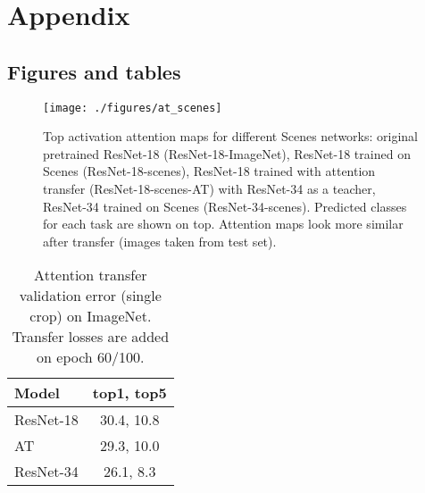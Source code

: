 \documentclass{article} \usepackage{iclr2017_conference}
\begin{document}



\newpage
\appendix
\section{Appendix}
\subsection{Figures and tables}

\begin{figure}[ht]
  \centering
  \texttt{[image: ./figures/at\_scenes]}
  \caption{Top activation attention maps for different Scenes networks: original pretrained ResNet-18 (ResNet-18-ImageNet), ResNet-18 trained on Scenes (ResNet-18-scenes), ResNet-18 trained with attention transfer (ResNet-18-scenes-AT) with ResNet-34 as a teacher, ResNet-34 trained on Scenes (ResNet-34-scenes). Predicted classes for each task are shown on top. Attention maps look more similar after transfer (images taken from test set).}
  \label{figure:scenes_sumabs_maps}
\end{figure}

\def\figatscale{0.42}
\begin{figure}[ht]
  \centering\small
  \hspace{0.2cm}
  \vspace{-0.2cm}
  \caption{}
\end{figure}

\begin{table}[h]
  \centering\small
  \begin{tabular}{|l|c|}
    \hline
    Model & top1, top5 \\ \hline
    ResNet-18 & 30.4, 10.8 \\
    AT & 29.3, 10.0 \\
    ResNet-34 & 26.1, 8.3 \\ \hline
  \end{tabular}
  \caption{Attention transfer validation error (single crop) on ImageNet. Transfer losses are added on epoch 60/100.}
  \label{table:at_imagenet_top5}
\end{table}
\end{document}

